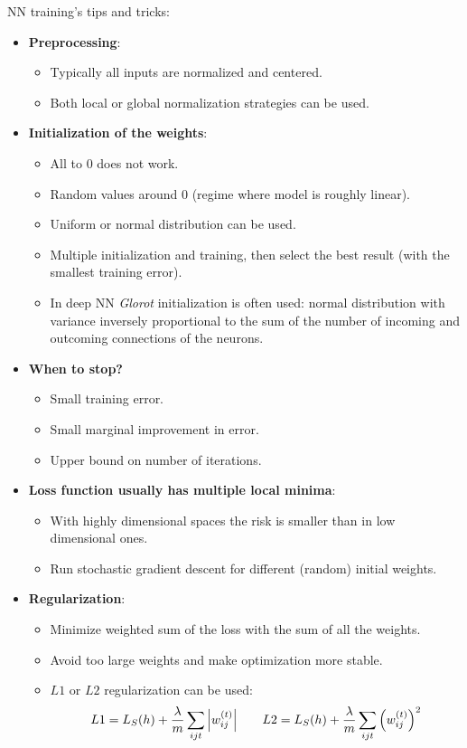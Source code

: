 \documentclass[12pt]{report}
\theoremstyle{plain}
\begin{document}
\begin{flushleft}
\begin{tcolorbox}
	\label{box:NN_SGD_backpropagation}
\end{tcolorbox}
NN training's tips and tricks:
\begin{itemize}
	\item \textbf{Preprocessing}:
	\begin{itemize}
		\item Typically all inputs are normalized and centered.
		\item Both local or global normalization strategies can be used.
	\end{itemize}
	\item \textbf{Initialization of the weights}:
	\begin{itemize}
		\item All to 0 does not work.
		\item Random values around 0 (regime where model is roughly linear).
		\item Uniform or normal distribution can be used.
		\item Multiple initialization and training, then select the best result (with the smallest training error).
		\item In deep NN \textit{Glorot} initialization is often used: normal distribution with variance inversely proportional to the sum of the number of incoming and outcoming connections of the neurons.  
	\end{itemize}
	\item \textbf{When to stop?}
	\begin{itemize}
		\item Small training error.
		\item Small marginal improvement in error.
		\item Upper bound on number of iterations.
	\end{itemize}
	\item \textbf{Loss function usually has multiple local minima}:
	\begin{itemize}
		\item With highly dimensional spaces the risk is smaller than in low dimensional ones.
		\item Run stochastic gradient descent for different (random) initial weights.
	\end{itemize}
	\item \textbf{Regularization}:
	\begin{itemize}
		\item Minimize weighted sum of the loss with the sum of all the weights.
		\item Avoid too large weights and make optimization more stable.
		\item $L1$ or $L2$ regularization can be used:
		\[ L1 = L_S(h)+\frac{\lambda}{m}\sum_{ijt}\abs{w_{ij}^{(t)}} \qquad L2 = L_S(h)+\frac{\lambda}{m}\sum_{ijt}\left(w_{ij}^{(t)}\right)^2 \] 
	\end{itemize}
\end{itemize}




\end{flushleft}
\end{document}
